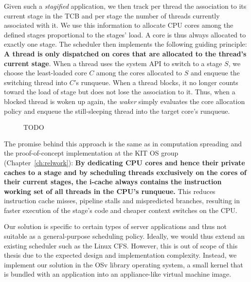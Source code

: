\documentclass[12pt,a4paper]{book}
\begin{document}
Given such a \emph{stagified} application, we then track per thread the association to its current stage in the TCB and per stage the number of threads currently associated with it.
We use this information to allocate CPU cores among the defined stages proportional to the stages' load.
A core is thus always allocated to exactly one stage. %
The scheduler then implements the following guiding principle: \textbf{A thread is only dispatched on cores that are allocated to the thread's current stage}.
When a thread uses the system API to switch to a stage $S$, we choose the least-loaded core $C$ among the cores allocated to $S$ and enqueue the switching thread into $C$'s runqueue.
When a thread blocks, it no longer counts toward the load of stage but does not lose the association to it.
Thus, when a blocked thread is woken up again, the \emph{waker} simply evaluates the core allocation policy and enqueue the still-sleeping thread into the target core's runqueue.

\begin{figure}[h]
    \caption{TODO}
\end{figure}

The promise behind this approach is the same as in computation spreading and the proof-of-concept implementation at the KIT OS group (Chapter~\ref{ch:relwork}):
\textbf{By dedicating CPU cores and hence their private caches to a stage and by scheduling threads exclusively on the cores of their current stages, the i-cache always contains the instruction working set of all threads in the CPU's runqueue.}
This reduces instruction cache misses, pipeline stalls and mispredicted branches, resulting in faster execution of the stage's code and cheaper context switches on the CPU. 

Our solution is specific to certain types of server applications and thus not suitable as a general-purpose scheduling policy.
Ideally, we would thus extend an existing scheduler such as the Linux CFS.
However, this is out of scope of this thesis due to the expected design and implementation complexity.
Instead, we implement our solution in the OSv library operating system, a small kernel that is bundled with an application into an appliance-like virtual machine image.
\end{document}
